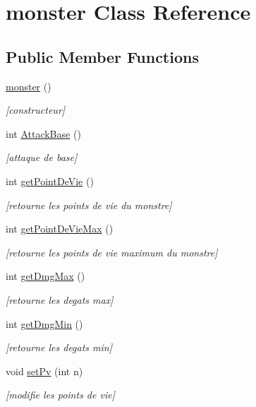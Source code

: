\hypertarget{classmonster}{}\section{monster Class Reference}
\label{classmonster}
\subsection*{Public Member Functions}
\begin{DoxyCompactItemize}
\item 
\hyperlink{classmonster_aa06fe45ef2076f6f62b5b84defddcd25}{monster} ()
\begin{DoxyCompactList}\small\item\em \mbox{[}constructeur\mbox{]} \end{DoxyCompactList}\item 
int \hyperlink{classmonster_ab70ff97de57e39e30ed85bb08db6d8fd}{Attack\+Base} ()
\begin{DoxyCompactList}\small\item\em \mbox{[}attaque de base\mbox{]} \end{DoxyCompactList}\item 
int \hyperlink{classmonster_aeef9bc2fd26c874c22db3c087722537a}{get\+Point\+De\+Vie} ()
\begin{DoxyCompactList}\small\item\em \mbox{[}retourne les points de vie du monstre\mbox{]} \end{DoxyCompactList}\item 
int \hyperlink{classmonster_a339edc6067915e3b5739bd151baceab6}{get\+Point\+De\+Vie\+Max} ()
\begin{DoxyCompactList}\small\item\em \mbox{[}retourne les points de vie maximum du monstre\mbox{]} \end{DoxyCompactList}\item 
int \hyperlink{classmonster_a528d52a39aaf445237242c0f875d55eb}{get\+Dmg\+Max} ()
\begin{DoxyCompactList}\small\item\em \mbox{[}retourne les degats max\mbox{]} \end{DoxyCompactList}\item 
int \hyperlink{classmonster_a50ac9a3b954236cd115357104765ca88}{get\+Dmg\+Min} ()
\begin{DoxyCompactList}\small\item\em \mbox{[}retourne les degats min\mbox{]} \end{DoxyCompactList}\item 
void \hyperlink{classmonster_a55ec03e003cffaaf20ce49269c80f716}{set\+Pv} (int n)
\begin{DoxyCompactList}\small\item\em \mbox{[}modifie les points de vie\mbox{]} \end{DoxyCompactList}\end{DoxyCompactItemize}


